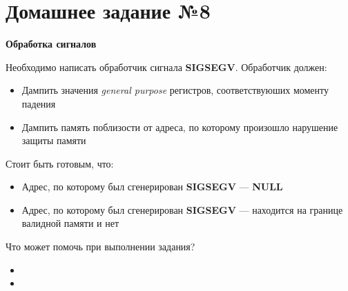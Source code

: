 \documentclass[../../lectures.tex]{subfiles}
\begin{document}
\section{Домашнее задание №8}
\begin{center}\textbf{Обработка сигналов}\end{center}

Необходимо написать обработчик сигнала \textbf{SIGSEGV}. Обработчик должен:
\begin{itemize}
    \item Дампить значения \emph{general purpose} регистров, соответствуюших моменту падения
    \item Дампить память поблизости от адреса, по которому произошло нарушение защиты памяти
\end{itemize}

Стоит быть готовым, что:
\begin{itemize}
    \item Адрес, по которому был сгенерирован \textbf{SIGSEGV} --- \textbf{NULL}
    \item Адрес, по которому был сгенерирован \textbf{SIGSEGV} --- находится на границе валидной памяти и нет
\end{itemize}

Что может помочь при выполнении задания?
\begin{itemize}
    \item {}
    \item {}
\end{itemize}
\end{document}
